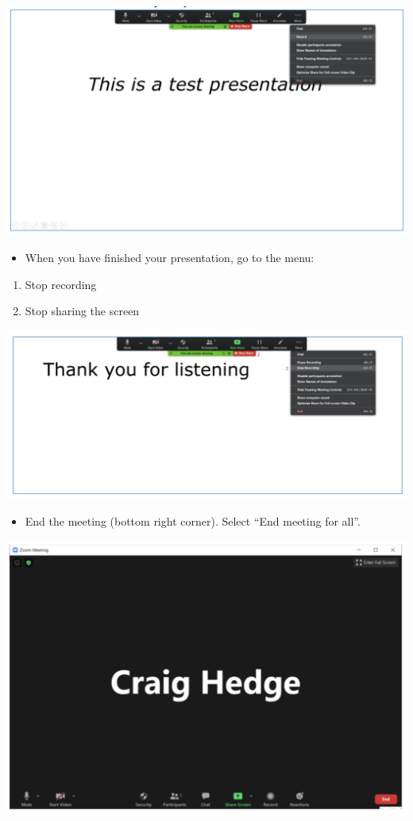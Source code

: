 \documentclass[
  12pt,
]{book}
\providecommand{\tightlist}{%
  \setlength{\itemsep}{0pt}\setlength{\parskip}{0pt}}
\begin{document}
\includegraphics{zoom6.png}

\begin{itemize}
\tightlist
\item
  When you have finished your presentation, go to the menu:
\end{itemize}

\begin{enumerate}
\def\labelenumi{\arabic{enumi}.}
\item
  Stop recording
\item
  Stop sharing the screen
\end{enumerate}

\includegraphics{zoom7.png}

\begin{itemize}
\tightlist
\item
  End the meeting (bottom right corner). Select ``End meeting for all''.
\end{itemize}

\includegraphics{zoom8.png}
\end{document}
